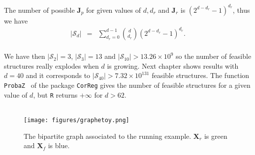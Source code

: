 \documentclass[12pt,a4paper]{report}
\begin{document}
			The number of possible $\boldsymbol{J}_p$ for given values of $d, d_r$ and $\boldsymbol{J}_r$ is $(2^{d-d_r}-1)^{d_r}$, thus we have
			\begin{eqnarray}
		|\mathcal{S}_d|&=&%
		 \sum_{d_r=0}^{d-1}{d \choose d_r}(2^{d-d_r}-1)^{d_r}. \nonumber
	\end{eqnarray}
	 \\
	We have then $|\mathcal{S}_2| =3 $, $|\mathcal{S}_3| =13 $ and $|\mathcal{S}_{10}| >13.26\times10^9 $ so the number of feasible structures really explodes when $d$ is growing. Next chapter shows results with $d=40$ and it corresponds to $|\mathcal{S}_{40}| >7.32\times10^{131} $ feasible structures. The function {\tt ProbaZ } of the package {\tt CorReg} gives the number of feasible structures for a given value of $d$, but {\tt R} returns $+\infty$ for $d>62$.\\
	\\
	\begin{figure}[h!]
	\centering
	\texttt{[image: figures/graphetoy.png]} 
	\caption{The bipartite graph associated to the running example. $\boldsymbol{X}_r$ is green and $\boldsymbol{X}_f$ is blue.}
	\end{figure}	
	
\end{document}
